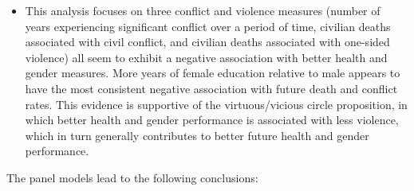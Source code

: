 \documentclass[12pt]{article}
\begin{document}
\begin{itemize}
\item This analysis focuses on three conflict and violence measures (number of years experiencing significant conflict over a period of time, civilian deaths associated with civil conflict, and civilian deaths associated with one-sided violence) all seem to exhibit a negative association with better health and gender measures. More years of female education relative to male appears to have the most consistent negative association with future death and conflict rates. This evidence is supportive of the virtuous/vicious circle proposition, in which better health and gender performance is associated with less violence, which in turn generally contributes to better future health and gender performance.
\end{itemize}

The panel models lead to the following conclusions:
\end{document}

